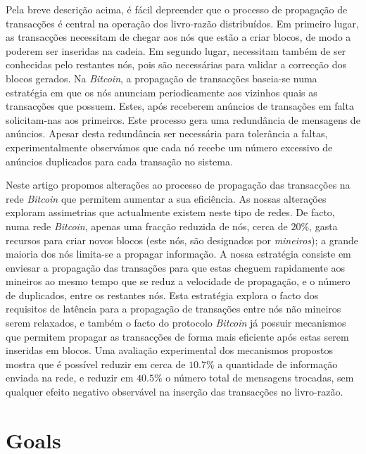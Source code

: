 Pela breve descrição acima, é fácil depreender que o processo de propagação de transacções é central na operação dos livro-razão distribuídos. Em primeiro lugar, as transacções necessitam de chegar aos nós que estão a criar blocos, de modo a poderem ser inseridas na cadeia. Em segundo lugar, necessitam também de ser conhecidas pelo restantes nós, pois são necessárias para validar a correcção dos blocos gerados. Na \emph{Bitcoin}, a propagação de transacções baseia-se numa estratégia em que os nós anunciam periodicamente aos vizinhos quais as transacções que possuem. Estes, após receberem anúncios de transações em falta solicitam-nas aos primeiros. 
Este processo gera uma redundância de mensagens de anúncios.
Apesar desta redundância ser necessária para tolerância a faltas, experimentalmente observámos que cada nó recebe um número excessivo de anúncios duplicados para cada transação no sistema.

Neste artigo propomos alterações ao processo de propagação das transacções na rede \emph{Bitcoin} que permitem aumentar a sua eficiência. As nossas alterações exploram assimetrias que actualmente existem neste tipo de redes. De facto, numa rede \emph{Bitcoin}, apenas uma fracção reduzida de nós, cerca de $20\%$, gasta recursos para criar novos blocos (este nós, são designados por \emph{mineiros}); a grande maioria dos nós limita-se a propagar informação. A nossa estratégia consiste em enviesar a propagação das transações para que estas cheguem rapidamente aos mineiros ao mesmo tempo que se reduz a velocidade de propagação,  e o número de duplicados, entre os restantes nós. 
Esta estratégia explora o facto dos requisitos de latência para a propagação de transações entre nós não mineiros serem relaxados, e também o facto do protocolo \emph{Bitcoin} já possuir mecanismos que permitem propagar as transacções de forma mais eficiente após estas serem inseridas em blocos. Uma avaliação experimental dos mecanismos propostos mostra que é possível reduzir em cerca de $10.7\%$ a quantidade de informação enviada na rede, e reduzir em $40.5\%$ o número total de mensagens trocadas, sem qualquer efeito negativo observável na inserção das transacções no livro-razão.

\section{Goals}
\label{sec:goals}

